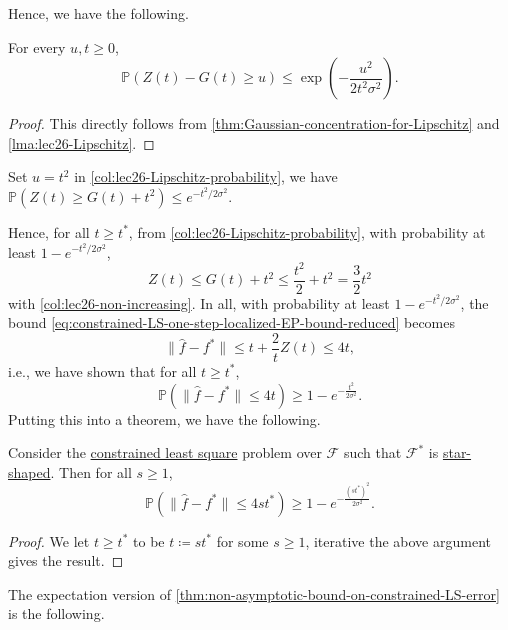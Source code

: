 Hence, we have the following.

\begin{corollary}\label{col:lec26-Lipschitz-probability}
	For every \(u, t \geq 0\),
	\[
		\mathbb{P} \left( Z(t) - G(t) \geq u \right) \leq \exp(- \frac{u^2}{2 t^2 \sigma ^2}).
	\]
\end{corollary}
\begin{proof}
	This directly follows from \autoref{thm:Gaussian-concentration-for-Lipschitz} and \autoref{lma:lec26-Lipschitz}.
\end{proof}

\begin{note}
	Set \(u = t^2\) in \autoref{col:lec26-Lipschitz-probability}, we have \(\mathbb{P} \left( Z(t) \geq G(t) + t^2 \right) \leq e^{- t^2 / 2 \sigma ^2}\).
\end{note}

Hence, for all \(t \geq t^{\ast} \), from \autoref{col:lec26-Lipschitz-probability}, with probability at least \(1 - e^{-t^2 / 2 \sigma ^2}\),
\[
	Z(t) \leq G(t) + t^2 \leq \frac{t^2}{2} + t^2 = \frac{3}{2}t^2
\]
with \autoref{col:lec26-non-increasing}. In all, with probability at least \(1 - e^{-t^2 / 2 \sigma ^2}\), the bound \autoref{eq:constrained-LS-one-step-localized-EP-bound-reduced} becomes
\[
	\lVert \hat{f} - f^{\ast} \rVert
	\leq t + \frac{2}{t} Z(t)
	\leq 4t,
\]
i.e., we have shown that for all \(t \geq t^{\ast} \),
\[
	\mathbb{P} \left( \lVert \hat{f} - f^{\ast} \rVert \leq 4t \right) \geq 1 - e^{-\frac{t^2}{2 \sigma ^2}}.
\]
Putting this into a theorem, we have the following.

\begin{theorem}\label{thm:non-asymptotic-bound-on-constrained-LS-error}
	Consider the \hyperref[prb:constrained-LS]{constrained least square} problem over \(\mathscr{F} \) such that \(\mathscr{F} ^{\ast} \) is \hyperref[def:star-shaped]{star-shaped}. Then for all \(s \geq 1\),
	\[
		\mathbb{P} \left( \lVert \hat{f} - f^{\ast} \rVert \leq 4 s t^{\ast} \right) \geq 1 - e^{-\frac{(s t^{\ast} )^2}{2 \sigma ^2}}.
	\]
\end{theorem}
\begin{proof}
	We let \(t \geq t^{\ast} \) to be \(t \coloneqq s t^{\ast} \) for some \(s \geq 1\), iterative the above argument gives the result.
\end{proof}

The expectation version of \autoref{thm:non-asymptotic-bound-on-constrained-LS-error} is the following.

